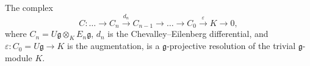 The complex
$$C: \dots \rightarrow C_n \xrightarrow{d_n} C_{n-1} \rightarrow \dots \rightarrow C_0 \xrightarrow{\varepsilon} K \rightarrow 0,$$
where $C_n = U\mathfrak{g} \otimes_K E_n \mathfrak{g}$, $d_n$ is the Chevalley--Eilenberg differential, and $\varepsilon : C_0 = U\mathfrak{g} \rightarrow K$ is the augmentation, is a $\mathfrak{g}$-projective resolution of the trivial $\mathfrak{g}$-module $K$.
